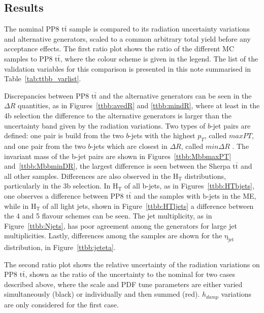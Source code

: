 \subsection{Results}
The nominal PP8 $\mathrm{t\bar{t}}$ sample is compared to its radiation uncertainty variations and alternative generators, 
scaled to a common arbitrary total yield before any acceptance effects.
The first ratio plot shows the ratio of the different MC samples to PP8 $\mathrm{t\bar{t}}$, where the colour scheme is given in the legend.
The list of the validation variables for this comparison is presented in this note summarised in Table~\ref{tab:ttbb_varlist}.

Discrepancies between PP8 $\mathrm{t\bar{t}}$ and the alternative generators can be seen in the $\Delta R$ quantities, as in Figures~\ref{ttbb:avedR} and \ref{ttbb:mindR}, where at least in the 4b selection the difference to the alternative generators is larger than the uncertainty band given by the radiation variations.  
Two types of $b$-jet pairs are defined: one pair is build from the two $b$-jets with the highest $p_T$, called $maxPT$, and one pair from the two $b$-jets which are closest in $\Delta R$, called $min \Delta R$ . The invariant mass of the b-jet pairs are shown in Figures~\ref{ttbb:MbbmaxPT} and~\ref{ttbb:MbbminDR}, the largest difference is seen between the Sherpa $\mathrm{t\bar{t}}$ and all other samples.
%
Differences are also observed in the $\mathrm{H_T}$ distributions, particularly in the 3b selection. In $\mathrm{H_T}$ of all b-jets, as in Figures~\ref{ttbb:HTbjets}, one observes a difference between PP8 $\mathrm{t\bar{t}}$ and the samples with b-jets in the ME, while in $\mathrm{H_T}$ of all light jets, shown in Figure~\ref{ttbb:HTljets} a difference between the 4 and 5 flavour schemes can be seen. The jet multiplicity, as in Figure~\ref{ttbb:Njets}, has poor agreement among the generators for large jet multiplicities.
Lastly, differences among the samples are shown for the $\mathrm{\eta_{jet}}$ distribution, in Figure~\ref{ttbb:jeteta}.

The second ratio plot shows the relative uncertainty of the radiation variations on PP8 $\mathrm{t\bar{t}}$, shown as the ratio of the uncertainty to the nominal for two cases described above, where the scale and PDF tune parameters are either varied simultaneously (black) or individually and then summed (red). $h_{damp}$ variations are only considered for the first case.



